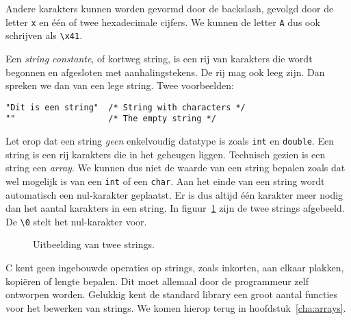 Andere karakters kunnen worden gevormd door de backslash, gevolgd door de letter \texttt{x} en één of twee hexadecimale cijfers. We kunnen de letter \texttt{A} dus ook schrijven als \texttt{\textquotesingle\textbackslash x41\textquotesingle}.

Een \textsl{string constante}, of kortweg string, is een rij van karakters die wordt begonnen en afgesloten met aanhalingstekens. De rij mag ook leeg zijn. Dan spreken we dan van een lege string. Twee voorbeelden:

\begin{lstlisting}[style=lstoneline]
"Dit is een string"  /* String with characters */
""                   /* The empty string */
\end{lstlisting}

Let erop dat een string \textsl{geen} enkelvoudig datatype is zoals \texttt{int} en \texttt{double}. Een string is een rij karakters die in het geheugen liggen. Technisch gezien is een string een \textsl{array}. We kunnen dus niet de waarde van een string bepalen zoals dat wel mogelijk is van een \texttt{int} of een \texttt{char}. Aan het einde van een string wordt automatisch een nul-karakter geplaatst. Er is dus altijd één karakter meer nodig dan het aantal karakters in een string. In figuur~\ref{fig:varstrings} zijn de twee strings afgebeeld. De \texttt{\textquotesingle\textbackslash0\textquotesingle} stelt het nul-karakter voor.

\begin{figure}[!ht]
\centering
{}
\caption{Uitbeelding van twee strings.}
\label{fig:varstrings}
\end{figure}

C kent geen ingebouwde operaties op strings, zoals inkorten, aan elkaar plakken, kopiëren of lengte bepalen. Dit moet allemaal door de programmeur zelf ontworpen worden. Gelukkig kent de standard library een groot aantal functies voor het bewerken van strings. We komen hierop terug in hoofdstuk~\ref{cha:arrays}.

